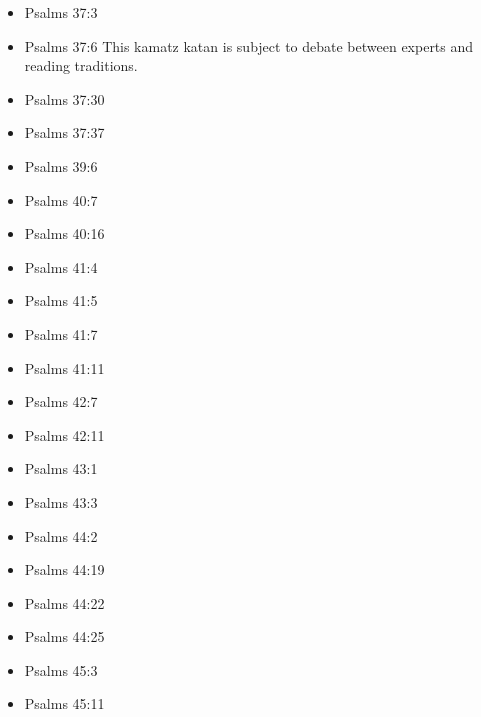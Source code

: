 \documentclass[14pt]{article}
\begin{document}
\begin{multicols}{2}
\begin{itemize}
\item Psalms 37:3

\item Psalms 37:6 This kamatz katan is subject to debate between experts and reading traditions.

\item Psalms 37:30

\item Psalms 37:37

\item Psalms 39:6

\item Psalms 40:7

\item Psalms 40:16

\item Psalms 41:4

\item Psalms 41:5

\item Psalms 41:7

\item Psalms 41:11

\item Psalms 42:7

\item Psalms 42:11

\item Psalms 43:1

\item Psalms 43:3

\item Psalms 44:2

\item Psalms 44:19

\item Psalms 44:22

\item Psalms 44:25

\item Psalms 45:3

\item Psalms 45:11


\end{itemize}
\end{multicols}
\end{document}
